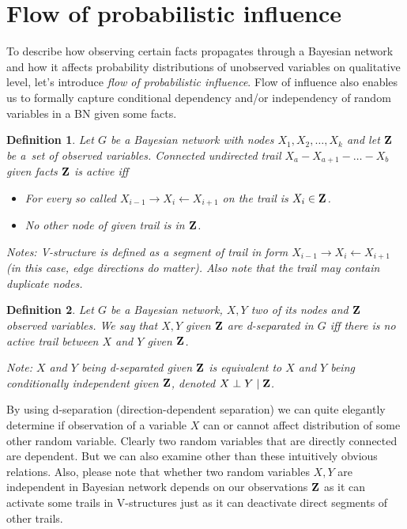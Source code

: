 \documentclass[english,cover]{fitthesis} %
\newtheorem{math_def}{Definition}[chapter] %
\newcommand{\term}[1]{\emph{#1}}           %
\newcommand{\vars}[1]{{\bold{#1}}}         %
\begin{document}
\section{Flow of probabilistic influence}
To describe how observing certain facts propagates through a Bayesian network and how it affects probability distributions of unobserved variables on qualitative level, let's introduce \term{flow of probabilistic influence}. Flow of influence also enables us to formally capture conditional dependency and/or independency of random variables in a BN given some facts.
\begin{math_def}
    Let $G$ be a Bayesian network with nodes $X_1, X_2, \dots, X_k$ and let $\vars{Z}$ be a~set of observed variables. Connected undirected trail $X_a - X_{a+1} - \dots - X_b$ given facts $\vars{Z}$ is active iff
    \begin{itemize}
        \item For every so called  $X_{i-1} \rightarrow X_i \leftarrow X_{i+1}$ on the trail is $X_i \in \vars{Z}$.
        \item No other node of given trail is in $\vars{Z}$.
    \end{itemize}
    Notes: V-structure is defined as a segment of trail in form $X_{i-1} \rightarrow X_i \leftarrow X_{i+1}$ (in this case, edge directions do matter). Also note that the trail may contain duplicate nodes.
\end{math_def}

\begin{math_def}
    Let $G$ be a Bayesian network, $X,Y$ two of its nodes and $\vars{Z}$ observed variables. We say that $X,Y$ given $\vars{Z}$ are d-separated in $G$ iff there is no active trail between $X$ and $Y$ given $\vars{Z}$.
    
    Note: $X$ and $Y$ being d-separated given $\vars{Z}$ is equivalent to $X$ and $Y$ being conditionally independent given $\vars{Z}$, denoted $X \perp Y \mid \vars{Z}$.
\end{math_def}

By using d-separation (direction-dependent separation) we can quite elegantly determine if observation of a variable $X$ can or cannot affect distribution of some other random variable. Clearly two random variables that are directly connected are dependent. But we can also examine other than these intuitively obvious relations. Also, please note that whether two random variables $X,Y$ are independent in Bayesian network depends on our observations $\vars{Z}$ as it can activate some trails in V-structures just as it can deactivate direct segments of other trails.
\end{document}
